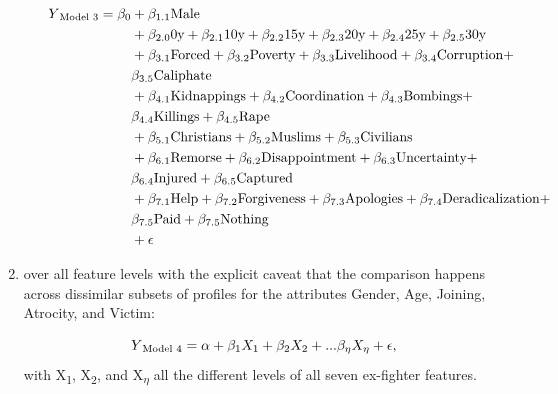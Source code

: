 \begin{enumerate}[noitemsep]
\begin{enumerate}[noitemsep]
\begin{align*} 
Y\textsubscript{\text{Model 3}} = \beta_{0}    & + \beta_{1.1}\text{Male} \\
                                            & + \beta_{2.0}\text{0y} + \beta_{2.1}\text{10y} + \beta_{2.2}\text{15y} + \beta_{2.3}\text{20y} + \beta_{2.4}\text{25y} + \beta_{2.5}\text{30y} \\
                                            & + \beta_{3.1}\text{Forced} + \beta_{3.2}\text{Poverty} + \beta_{3.3}\text{Livelihood} + \beta_{3.4}\text{Corruption} + \\ & \beta_{3.5}\text{Caliphate} \\
                                            & + \beta_{4.1}\text{Kidnappings} + \beta_{4.2}\text{Coordination} + \beta_{4.3}\text{Bombings} + \\ 
                                            &\beta_{4.4}\text{Killings} + \beta_{4.5}\text{Rape} \\
                                            & + \beta_{5.1}\text{Christians} + \beta_{5.2}\text{Muslims} + \beta_{5.3}\text{Civilians} \\
                                            & + \beta_{6.1}\text{Remorse} + \beta_{6.2}\text{Disappointment} + \beta_{6.3}\text{Uncertainty} + \\
                                            & \beta_{6.4}\text{Injured} + \beta_{6.5}\text{Captured} \\
                                            & + \beta_{7.1}\text{Help} + \beta_{7.2}\text{Forgiveness} + \beta_{7.3}\text{Apologies} + \beta_{7.4}\text{Deradicalization} +\\
                                            & \beta_{7.5}\text{Paid} + \beta_{7.5}\text{Nothing} \\
                                            & + \epsilon
\end{align*}
\end{enumerate}

\item  over all feature levels with the explicit caveat that the comparison happens across dissimilar subsets of profiles for the attributes Gender, Age, Joining, Atrocity, and Victim:

\begin{equation*}
Y\textsubscript{\text{Model 4}} = \alpha + \beta_{1}X_{1} + \beta_{2}X_{2} + ... \beta_{\eta}X_{\eta} + \epsilon,
\end{equation*}
with X\textsubscript{1}, X\textsubscript{2}, and X\textsubscript{$\eta$} all the different levels of all seven ex-fighter features.

\end{enumerate}


